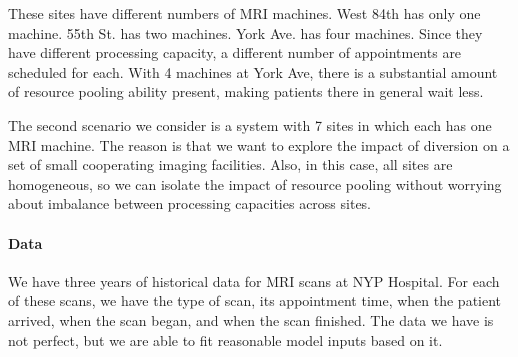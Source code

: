 These sites have different numbers of MRI machines. West 84th has
only one machine. 55th St. has two machines. York Ave. has four machines.
Since they have different processing capacity, a different number of
appointments are scheduled for each. With 4 machines at York Ave, there is a
substantial amount of resource pooling ability present, making
patients there in general wait less.

The second scenario we consider is a system with 7 sites in which each has one
MRI machine. The reason is that we want to explore the impact of
diversion on a set of small cooperating imaging facilities. Also,
in this case, all sites are homogeneous, so we can isolate
the impact of resource pooling without worrying about imbalance between
processing capacities across sites.

\paragraph{Data}
We have three years of historical data for MRI scans at NYP Hospital.
For each of these scans, we have the type of scan, its appointment time, when
the patient arrived, when the scan began, and when the scan finished. The data we have
is not perfect, but we are able to fit reasonable model inputs based on it.

